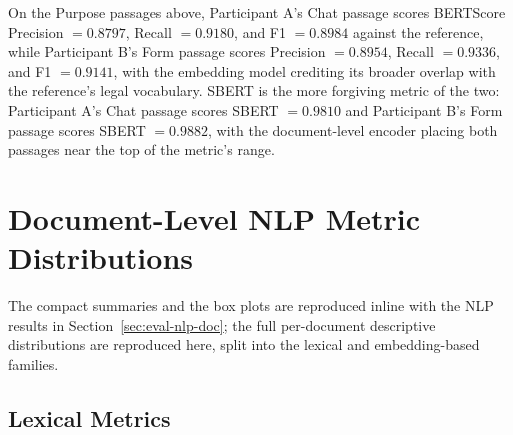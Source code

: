 On the Purpose passages above, Participant A's Chat passage
scores BERTScore Precision $= 0.8797$, Recall $= 0.9180$, and F1
$= 0.8984$ against the reference, while Participant B's Form
passage scores Precision $= 0.8954$, Recall $= 0.9336$, and F1
$= 0.9141$, with the embedding model crediting its broader
overlap with the reference's legal vocabulary. SBERT is the more
forgiving metric of the two: Participant A's Chat passage scores
SBERT $= 0.9810$ and Participant B's Form passage scores SBERT
$= 0.9882$, with the document-level encoder placing both
passages near the top of the metric's range.


\section{Document-Level NLP Metric Distributions}
\label{app:items-nlp-doc}

The compact summaries and the box plots are reproduced inline with
the NLP results in Section~\ref{sec:eval-nlp-doc}; the full
per-document descriptive distributions are reproduced here, split
into the lexical and embedding-based families.

\subsection{Lexical Metrics}
\label{app:items-nlp-doc-lexical}

